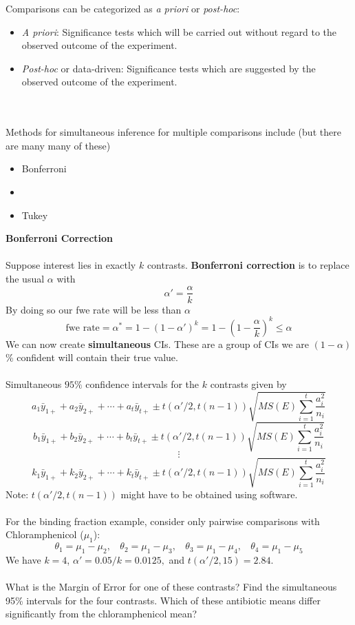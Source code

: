 Comparisons can be categorized as {\em a priori} or {\em post-hoc}:
\begin{itemize}
\item {\em A priori}: Significance tests which will be carried out without regard to the observed outcome of the experiment.
\item {\em Post-hoc} or data-driven: Significance tests which are suggested by the observed outcome of the experiment.
\end{itemize}
~\\~\\
Methods for simultaneous inference for multiple comparisons include (but there are many many of these)
\begin{itemize}
\item Bonferroni
\item \chef
\item Tukey
\end{itemize}

\newpage

\textbf{Bonferroni Correction}\\~\\
Suppose interest lies in exactly $k$ contrasts.  \textbf{Bonferroni correction} is to replace the usual $\alpha$ with
$$ \alpha'=\frac{\alpha}{k} $$
By doing so our fwe rate will be less than $\alpha$
$$\mbox{fwe rate}=\alpha^{*}=1-(1-\alpha')^{k}=1-(1-\frac{\alpha}{k})^{k}\leq \alpha$$
We can now create \textbf{simultaneous} CIs.  These are a group of CIs we are $(1-\alpha)$\% confident will  contain their true value.\\~\\
Simultaneous $95\%$ confidence intervals for the $k$ contrasts given by
$$ a_1 \bar{y}_{1+} + a_2 \bar{y}_{2+} + \cdots + a_t \bar{y}_{t+} \pm t(\alpha'/2,t(n-1))\sqrt{MS(E) \sum_{i=1}^{t} \frac{a_i^2}{n_i}} $$
$$ b_1 \bar{y}_{1+} + b_2 \bar{y}_{2+} + \cdots + b_t \bar{y}_{t+} \pm t(\alpha'/2,t(n-1))\sqrt{MS(E) \sum_{i=1}^{t} \frac{a_i^2}{n_i}} $$
$$\vdots$$ 
$$ k_1 \bar{y}_{1+} + k_2 \bar{y}_{2+} + \cdots + k_t \bar{y}_{t+} \pm t(\alpha'/2,t(n-1))\sqrt{MS(E) \sum_{i=1}^{t} \frac{a_i^2}{n_i}} $$
Note: $t(\alpha'/2,t(n-1))$ might have to be obtained using software.\\~\\

For the binding fraction example, consider only pairwise comparisons with Chloramphenicol ($\mu_1$):
$$\theta_1 = \mu_1-\mu_2, ~~~~\theta_2 = \mu_1-\mu_3, ~~~~\theta_3 = \mu_1-\mu_4, ~~~~\theta_4 = \mu_1-\mu_5$$
We have $k=4$, $ \alpha'=0.05/k=0.0125,$ and $t(\alpha'/2,15) = 2.84$.\\~\\
What is the Margin of Error for one of these contrasts?  Find the simultaneous 95\% intervals for the four contrasts.  Which of these antibiotic means differ significantly from the chloramphenicol mean?\\

